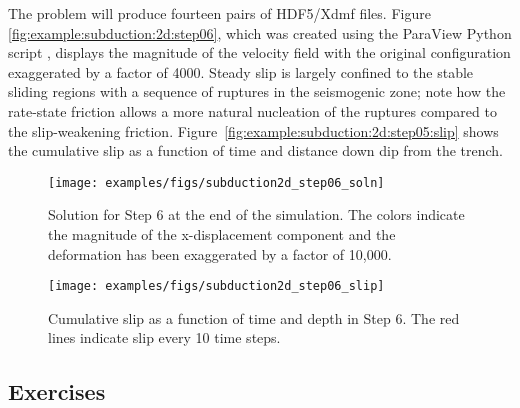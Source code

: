 The problem will produce fourteen pairs of HDF5/Xdmf files. Figure
\vref{fig:example:subduction:2d:step06}, which was created using the
ParaView Python script , displays the
magnitude of the velocity field with the original configuration
exaggerated by a factor of 4000. Steady slip is largely confined to
the stable sliding regions with a sequence of ruptures in the
seismogenic zone; note how the rate-state friction allows a more
natural nucleation of the ruptures compared to the slip-weakening
friction. Figure~\ref{fig:example:subduction:2d:step05:slip} shows the
cumulative slip as a function of time and distance down dip from the
trench.

\begin{figure}
  \texttt{[image: examples/figs/subduction2d\_step06\_soln]}
  \caption{Solution for Step 6 at the end of the simulation. The
    colors indicate the magnitude of the x-displacement component and
    the deformation has been exaggerated by a factor of 10,000.}
  \label{fig:example:subduction:2d:step06}
\end{figure}

\begin{figure}
  \texttt{[image: examples/figs/subduction2d\_step06\_slip]}
  \caption{Cumulative slip as a function of time and depth in Step
    6. The red lines indicate slip every 10 time steps.}
  \label{fig:example:subduction:2d:step06:slip}
\end{figure}


\subsection{Exercises}

